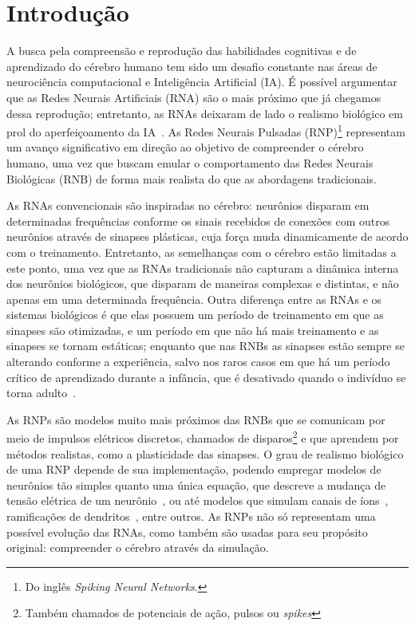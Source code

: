 \chapter{Introdução}

A busca pela compreensão e reprodução das habilidades cognitivas e de aprendizado do cérebro humano tem sido um desafio constante
nas áreas de neurociência computacional e Inteligência Artificial (IA). É possível argumentar que as Redes Neurais Artificiais
(RNA) são o mais próximo que já chegamos dessa reprodução; entretanto, as RNAs deixaram de lado o realismo biológico em prol do
aperfeiçoamento da IA~\cite{yamazakiSpiking2022}. As Redes Neurais Pulsadas (RNP)\footnote{Do inglês \textit{Spiking Neural
Networks}.} representam um avanço significativo em direção ao objetivo de compreender o cérebro humano, uma vez que buscam emular
o comportamento das Redes Neurais Biológicas (RNB) de forma mais realista do que as abordagens tradicionais.

As RNAs convencionais são inspiradas no cérebro: neurônios disparam em determinadas frequências conforme os sinais recebidos de
conexões com outros neurônios através de sinapses plásticas, cuja força muda dinamicamente de acordo com o treinamento.
Entretanto, as semelhanças com o cérebro estão limitadas a este ponto, uma vez que as RNAs tradicionais não capturam a dinâmica
interna dos neurônios biológicos, que disparam de maneiras complexas e distintas, e não apenas em uma determinada frequência.
Outra diferença entre as RNAs e os sistemas biológicos é que elas possuem um período de treinamento em que as sinapses são
otimizadas, e um período em que não há mais treinamento e as sinapses se tornam estáticas; enquanto que nas RNBs as sinapses estão
sempre se alterando conforme a experiência, salvo nos raros casos em que há um período crítico de aprendizado durante a infância,
que é desativado quando o indivíduo se torna adulto~\cite{crepelRegression1982}.

As RNPs são modelos muito mais próximos das RNBs que se comunicam por meio de impulsos elétricos discretos, chamados de
disparos\footnote{Também chamados de potenciais de ação, pulsos ou \textit{spikes}} e que aprendem por métodos realistas, como a
plasticidade das sinapses. O grau de realismo biológico de uma RNP depende de sua implementação, podendo empregar modelos de
neurônios tão simples quanto uma única equação, que descreve a mudança de tensão elétrica de um neurônio~\cite{burkittReview2006},
ou até modelos que simulam canais de íons~\cite{hodgkinQuantitative1952}, ramificações de
dendritos~\cite{pagkalosIntroducing2023}, entre outros. As RNPs não só representam uma possível evolução das RNAs, como também são
usadas para seu propósito original: compreender o cérebro através da simulação.

